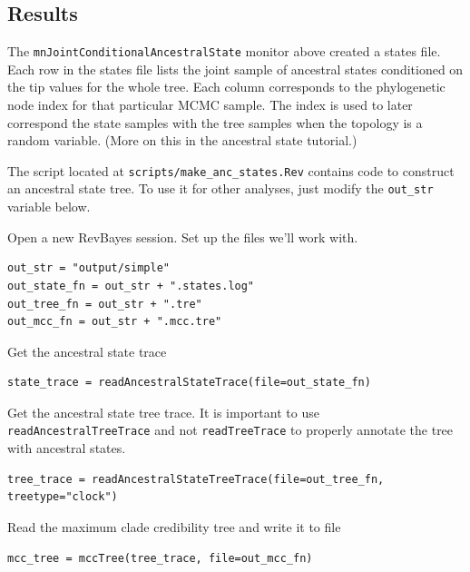 \subsection*{Results}

The {\tt mnJointConditionalAncestralState} monitor above created a states file.
Each row in the states file lists the joint sample of ancestral states conditioned on the tip values for the whole tree.
Each column corresponds to the phylogenetic node index for that particular MCMC sample.
The index is used to later correspond the state samples with the tree samples when the topology is a random variable.
(More on this in the ancestral state tutorial.)

The script located at {\tt scripts/make\_anc\_states.Rev} contains code to construct an ancestral state tree.
To use it for other analyses, just modify the {\tt out\_str} variable below.

Open a new RevBayes session. Set up the files we'll work with.
\begin{snugshade}
\begin{lstlisting}
out_str = "output/simple"
out_state_fn = out_str + ".states.log"
out_tree_fn = out_str + ".tre"
out_mcc_fn = out_str + ".mcc.tre" 
\end{lstlisting}
\end{snugshade}


Get the ancestral state trace

\begin{snugshade}
\begin{lstlisting}
state_trace = readAncestralStateTrace(file=out_state_fn)
\end{lstlisting}
\end{snugshade}


Get the ancestral state tree trace. It is important to use {\tt readAncestralTreeTrace} and not {\tt readTreeTrace} to properly annotate the tree with ancestral states.

\begin{snugshade}
\begin{lstlisting}
tree_trace = readAncestralStateTreeTrace(file=out_tree_fn, treetype="clock")
\end{lstlisting}
\end{snugshade}

Read the maximum clade credibility tree and write it to file

\begin{snugshade}
\begin{lstlisting}
mcc_tree = mccTree(tree_trace, file=out_mcc_fn)
\end{lstlisting}
\end{snugshade}


